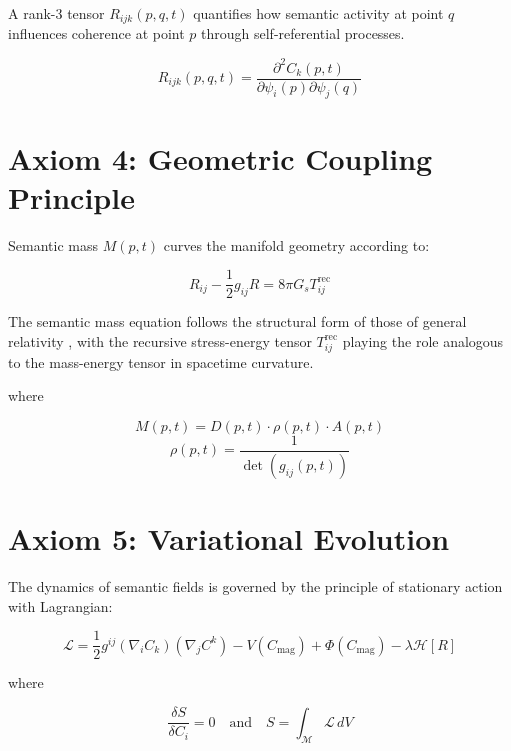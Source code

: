 A rank-3 tensor \(R_{ijk}(p,q,t)\) quantifies how semantic activity at point \(q\) influences coherence at point \(p\) through self-referential processes.

\begin{equation}
R_{ijk}(p,q,t) = \frac{\partial^2 C_k(p,t)}{\partial \psi_i(p) \partial \psi_j(q)}
\end{equation}

\section{Axiom 4: Geometric Coupling Principle}

Semantic mass \(M(p,t)\) curves the manifold geometry according to:

\begin{equation}
R_{ij} - \frac{1}{2}g_{ij}R = 8\pi G_s T^{\text{rec}}_{ij}
\end{equation}

The semantic mass equation follows the structural form of those of general relativity \autocite{Einstein1915, MisnerThorneWheeler1973}, with the recursive stress-energy tensor \(T^{\text{rec}}_{ij}\) playing the role analogous to the mass-energy tensor in spacetime curvature.

where

\begin{equation}
M(p,t) = D(p,t) \cdot \rho(p,t) \cdot A(p,t)
\end{equation}
\begin{equation}
\rho(p,t) = \frac{1}{\det(g_{ij}(p,t))}
\end{equation}

\section{Axiom 5: Variational Evolution}

The dynamics of semantic fields is governed by the principle of stationary action with Lagrangian:

\begin{equation}
\mathcal{L} = \frac{1}{2} g^{ij} (\nabla_i C_k)(\nabla_j C^k) - V(C_{\text{mag}}) + \Phi(C_{\text{mag}}) - \lambda \mathcal{H}[R]
\end{equation}

where

\begin{equation}
\frac{\delta S}{\delta C_i} = 0 \quad \text{and} \quad S = \int_{\mathcal{M}} \mathcal{L} \, dV
\end{equation}


